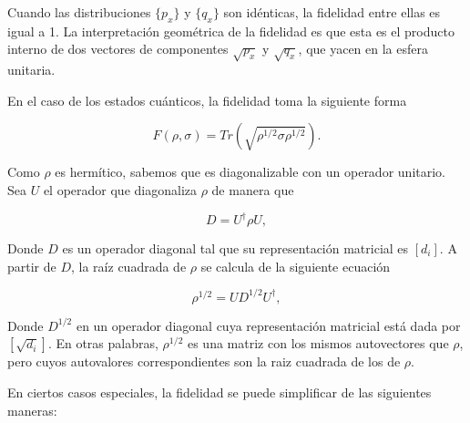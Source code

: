 Cuando las distribuciones $\{p_x\}$ y $\{q_x\}$ son idénticas, la fidelidad entre ellas es igual a 1. La interpretación geométrica de la fidelidad es que esta es el producto interno de dos vectores de componentes $\sqrt{p_x}$ y $\sqrt{q_x}$, que yacen en la esfera unitaria.

En el caso de los estados cuánticos, la fidelidad toma la siguiente forma \cite{Nielsen_2009}

\begin{equation}
    F(\rho, \sigma) = Tr(\sqrt{\rho^{1/2} \sigma \rho^{1/2}}) .
\end{equation}

Como $\rho$ es hermítico, sabemos que es diagonalizable con un operador unitario. Sea $U$ el operador que diagonaliza $\rho$ de manera que

\begin{equation}
    D = U^\dagger \rho U ,
\end{equation}

Donde $D$ es un operador diagonal tal que su representación matricial es $[d_i]$. A partir de $D$, la raíz cuadrada de $\rho$ se calcula de la siguiente ecuación

\begin{equation}
    \rho^{1/2} = U D^{1/2} U^\dagger ,
\end{equation}

Donde $D^{1/2}$ en un operador diagonal cuya representación matricial está dada por $[\sqrt{d_i}]$. En otras palabras, $\rho^{1/2}$ es una matriz con los mismos autovectores que $\rho$, pero cuyos autovalores correspondientes son la raiz cuadrada de los de $\rho$.

En ciertos casos especiales, la fidelidad se puede simplificar de las siguientes maneras:

